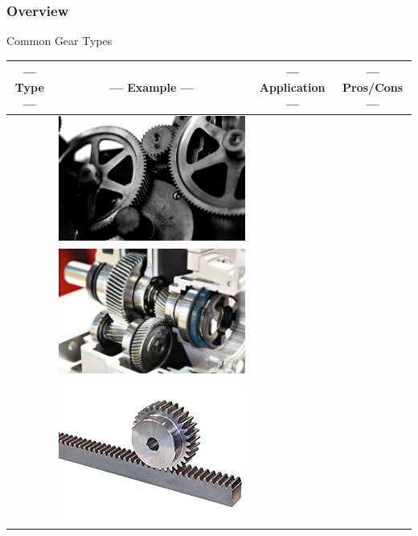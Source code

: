 \documentclass[fleqn]{beamer} %
\newcommand{\sectiontitleI}{Overview} %
\begin{document}
	\begin{frame}[label=sectionI] \small
		\frametitle{\sectiontitleI}	
		
		Common Gear Types

		\begin{tabular}{|c|c|c|c|} 
			--- Type --- & --- Example --- & --- Application --- & --- Pros/Cons --- \\ \hline
			& \includegraphics[scale=.07]{images/spur_gear.png} & & \\ \hline 
			& \includegraphics[scale=.35]{images/helical_gear.png} & & \\ \hline
			& \includegraphics[scale=.65]{images/rack_and_pinion2.png} & & \\ \hline
		\end{tabular}


\end{frame}
\end{document}
